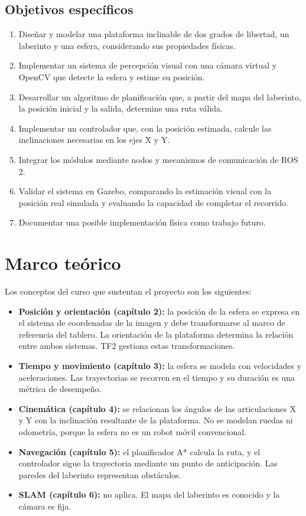 \documentclass[11pt,a4paper]{article}
\begin{document}
\subsection{Objetivos específicos}
\begin{enumerate}[label=\arabic*.]
    \item Diseñar y modelar una plataforma inclinable de dos grados de libertad, un laberinto y una esfera, considerando sus propiedades físicas.
    \item Implementar un sistema de percepción visual con una cámara virtual y OpenCV que detecte la esfera y estime su posición.
    \item Desarrollar un algoritmo de planificación que, a partir del mapa del laberinto, la posición inicial y la salida, determine una ruta válida.
    \item Implementar un controlador que, con la posición estimada, calcule las inclinaciones necesarias en los ejes X y Y.
    \item Integrar los módulos mediante nodos y mecanismos de comunicación de ROS 2.
    \item Validar el sistema en Gazebo, comparando la estimación visual con la posición real simulada y evaluando la capacidad de completar el recorrido.
    \item Documentar una posible implementación física como trabajo futuro.
\end{enumerate}

\section{Marco teórico}
Los conceptos del curso que sustentan el proyecto son los siguientes:

\begin{itemize}
    \item \textbf{Posición y orientación (capítulo 2):} la posición de la esfera se expresa en el sistema de coordenadas de la imagen y debe transformarse al marco de referencia del tablero. La orientación de la plataforma determina la relación entre ambos sistemas. TF2 gestiona estas transformaciones.
    \item \textbf{Tiempo y movimiento (capítulo 3):} la esfera se modela con velocidades y aceleraciones. Las trayectorias se recorren en el tiempo y su duración es una métrica de desempeño.
    \item \textbf{Cinemática (capítulo 4):} se relacionan los ángulos de las articulaciones X y Y con la inclinación resultante de la plataforma. No se modelan ruedas ni odometría, porque la esfera no es un robot móvil convencional.
    \item \textbf{Navegación (capítulo 5):} el planificador A* calcula la ruta, y el controlador sigue la trayectoria mediante un punto de anticipación. Las paredes del laberinto representan obstáculos.
    \item \textbf{SLAM (capítulo 6):} no aplica. El mapa del laberinto es conocido y la cámara es fija.
\end{itemize}
\end{document}
